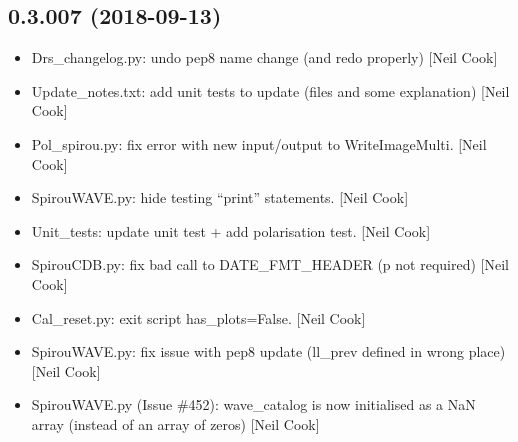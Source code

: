 \documentclass[a4paper,10pt,english]{report}
\begin{document}
\subsection{0.3.007 (2018-09-13)}
\label{\detokenize{misc/changelog:id325}}\begin{itemize}
\item {} 
Drs\_changelog.py: undo pep8 name change (and redo properly) {[}Neil
Cook{]}

\item {} 
Update\_notes.txt: add unit tests to update (files and some
explanation) {[}Neil Cook{]}

\item {} 
Pol\_spirou.py: fix error with new input/output to WriteImageMulti.
{[}Neil Cook{]}

\item {} 
SpirouWAVE.py: hide testing “print” statements. {[}Neil Cook{]}

\item {} 
Unit\_tests: update unit test + add polarisation test. {[}Neil Cook{]}

\item {} 
SpirouCDB.py: fix bad call to DATE\_FMT\_HEADER (p not required) {[}Neil
Cook{]}

\item {} 
Cal\_reset.py: exit script has\_plots=False. {[}Neil Cook{]}

\item {} 
SpirouWAVE.py: fix issue with pep8 update (ll\_prev defined in wrong
place) {[}Neil Cook{]}

\item {} 
SpirouWAVE.py (Issue \#452): wave\_catalog is now initialised as a NaN
array (instead of an array of zeros) {[}Neil Cook{]}

\end{itemize}
\end{document}
